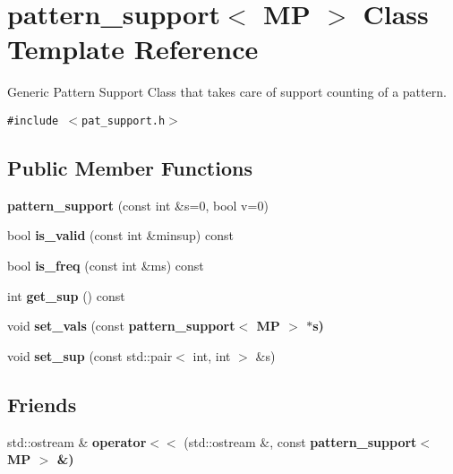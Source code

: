 \section{pattern\_\-support$<$ MP $>$ Class Template Reference}
\label{classpattern__support}
Generic Pattern Support Class that takes care of support counting of a pattern.  


{\tt \#include $<$pat\_\-support.h$>$}

\subsection*{Public Member Functions}
\begin{CompactItemize}
\item 
\textbf{pattern\_\-support} (const int \&s=0, bool v=0)\label{classpattern__support_f461d3ee3a4d8a2999a164e266b32971}

\item 
bool \textbf{is\_\-valid} (const int \&minsup) const \label{classpattern__support_5ff596f63780bc6e7a5ebbbf4a17c791}

\item 
bool \textbf{is\_\-freq} (const int \&ms) const \label{classpattern__support_46d0c7ce607ea9a387099dce7629772e}

\item 
int \textbf{get\_\-sup} () const \label{classpattern__support_80615fabcc0c5e4043531c90dd2b2a64}

\item 
void \textbf{set\_\-vals} (const \bf{pattern\_\-support}$<$ MP $>$ $\ast$s)\label{classpattern__support_a54cccfd00ce22f6dae6ebc03af412da}

\item 
void \textbf{set\_\-sup} (const std::pair$<$ int, int $>$ \&s)\label{classpattern__support_ceb8296801b8f94ae5ec5e00f0867b9d}

\end{CompactItemize}
\subsection*{Friends}
\begin{CompactItemize}
\item 
std::ostream \& \textbf{operator$<$$<$} (std::ostream \&, const \bf{pattern\_\-support}$<$ MP $>$ \&)\label{classpattern__support_1d08420b42e143fd53b33192971c79e6}

\end{CompactItemize}


